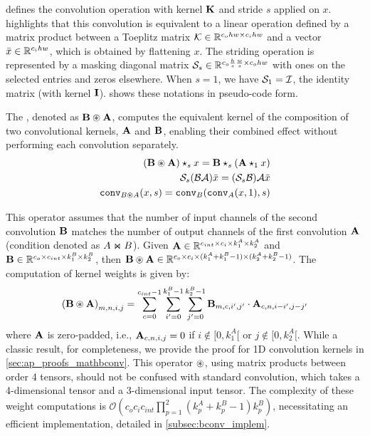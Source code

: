  defines the convolution operation with kernel $\mathbf{K}$ and stride $s$ applied on $x$.  highlights that this convolution is equivalent to a linear operation defined by a matrix product between a Toeplitz matrix $\mathcal{K} \in \mathbb{R}^{c_ohw \times c_ihw}$ and a vector $\bar{x} \in \mathbb{R}^{c_i hw}$, which is obtained by flattening $x$. The striding operation is represented by a masking diagonal matrix $\mathcal{S}_{s} \in \mathbb{R}^{c_o \frac{h}{s} \frac{w}{s} \times c_o hw}$ with ones on the selected entries and zeros elsewhere. When $s=1$, we have $\mathcal{S}_{1} = \mathcal{I}$, the identity matrix (with kernel $\mathbf{I}$).  shows these notations in pseudo-code form.

\begin{definition}  
    The \Bconv, denoted as $\mathbf{B} \circledast \mathbf{A}$, computes the equivalent kernel of the composition of two convolutional kernels, $\mathbf{A}$ and $\mathbf{B}$, enabling their combined effect without performing each convolution separately.
    \begin{align}
        (\mathbf{B} \circledast \mathbf{A}) \star_{s} x = \mathbf{B} \star_{s} (\mathbf{A} \star_{1} x ) \label{def_blocker}\\
        \mathcal{S}_{s} (\mathcal{B} \mathcal{A}) \bar{x} = (\mathcal{S}_{s} \mathcal{B}) \mathcal{A} \bar{x} \label{def_bloctoep} \\
        \mathtt{conv}_{B \circledast A}(x, s) = \mathtt{conv}_{B}(\mathtt{conv}_{A}(x, 1), s) \label{def_bloccode}
    \end{align}
\end{definition}
\noindent This operator assumes that the number of input channels of the second convolution $\mathbf{B}$ matches the number of output channels of the first convolution $\mathbf{A}$ (condition denoted as $A\Join B$). Given $\mathbf{A} \in \mathbb{R}^{c_{int} \times c_i \times k_1^A \times k_2^A}$ and $\mathbf{B} \in \mathbb{R}^{c_o \times c_{int} \times k_1^B \times k_2^B}$, then $\mathbf{B} \circledast \mathbf{A} \in \mathbb{R}^{c_o \times c_i \times (k_1^A + k_1^B - 1) \times (k_2^A + k_2^B - 1)}$. 
The computation of \Bconv{} kernel weights is given by:
\begin{equation}
\label{eq:blockconv}
   {(\mathbf{B} \circledast\mathbf{A})}_{m,n,i,j} = \sum_{c = 0}^{c_{int}-1} \sum_{i' = 0}^{k_1^B - 1} \sum_{j' = 0}^{k_2^B - 1} \mathbf{B}_{m,c,i',j'} \cdot \mathbf{A}_{c,n,i - i',j - j'} 
\end{equation}
where $\mathbf{A}$ is zero-padded, i.e., $\mathbf{A}_{c,n,i,j} = 0$ if $i \notin [0, k_1^A[$ or $j \notin [0, k_2^A[$. While a classic result, for completeness, we provide the proof for 1D convolution kernels in \cref{sec:ap_proofs_mathbconv}. This operator $\circledast$, using matrix products between order 4 tensors, should not be confused with standard convolution, which takes a 4-dimensional tensor and a 3-dimensional input tensor. The complexity of these weight computations is $\mathcal{O}(c_o c_i c_{int} \prod\limits_{p=1}^{2} (k_p^A + k_p^B - 1) k_p^B)$, necessitating an efficient implementation, detailed in  \cref{subsec:bconv_implem}.

